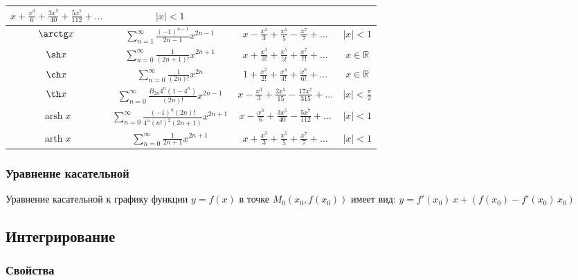 \begin{tabu}[t]{||c|c|c|c||}
		$\displaystyle x + \frac{x^3}{6} + \frac{3x^5}{40} + \frac{5x^7}{112} + \dots $ & 
		$\displaystyle |x| < 1 $ \\
	\hline
		$\displaystyle \arctg x $ & 
		$\displaystyle \sum^{\infty}_{n=1} \frac{(-1)^{n-1}}{2n-1} x^{2n-1} $ & 
		$\displaystyle x - \frac{x^3}{3} + \frac{x^5}{5} - \frac{x^7}{7} + \dots $ & 
		$\displaystyle  |x| < 1 $ \\
	\hline
		$\displaystyle \sh x $ & 
		$\displaystyle \sum^{\infty}_{n=0} \frac{1}{(2n+1)!} x^{2n+1} $ & 
		$\displaystyle x + \frac{x^3}{3!} + \frac{x^5}{5!} + \frac{x^7}{7!} + \dots $ & 
		$\displaystyle x\in\mathbb{R} $ \\
	\hline
		$\displaystyle \ch x $ & 
		$\displaystyle \sum^{\infty}_{n=0} \frac{1}{(2n)!} x^{2n} $ & 
		$\displaystyle 1 + \frac{x^2}{2!} + \frac{x^4}{4!} + \frac{x^6}{6!} + \dots $ & 
		$\displaystyle x\in\mathbb{R} $ \\
	\hline
		$\displaystyle \th x $ & 
		$\displaystyle \sum_{n=0}^{\infty} \frac{B_{2n}4^n(1-4^n)}{(2n)!} x^{2n-1} $ & 
		$\displaystyle x - \frac{x^3}{3} + \frac{2x^5}{15} - \frac{17x^7}{315} + \dots $ & 
		$\displaystyle |x| < \frac{\pi}{2} $ \\
	\hline
		$\displaystyle \operatorname{arsh} x $ & 
		$\displaystyle \sum^{\infty}_{n=0} \frac{(-1)^n (2n)!}{4^n (n!)^2 (2n+1)} x^{2n+1} $ & 
		$\displaystyle x - \frac{x^3}{6} + \frac{3x^5}{40} - \frac{5x^7}{112} + \dots $ & 
		$\displaystyle |x| < 1 $ \\
	\hline
		$\displaystyle \operatorname{arth} x $ & 
		$\displaystyle \sum^{\infty}_{n=0} \frac{1}{2n + 1} x^{2n+1} $ & 
		$\displaystyle x + \frac{x^3}{3} + \frac{x^5}{5} + \frac{x^7}{7} + \dots $ & 
		$\displaystyle |x| < 1 $ \\
	\hline
\end{tabu}

\subsubsection{Уравнение касательной}

Уравнение касательной к графику функции $\displaystyle y = f(x) $ в точке $\displaystyle M_0(x_0, f(x_0)) $ имеет вид:
$ y = f'(x_0)\, x + (f(x_0) - f'(x_0)\, x_0) $

\subsection{Интегрирование}

\subsubsection{Свойства}

